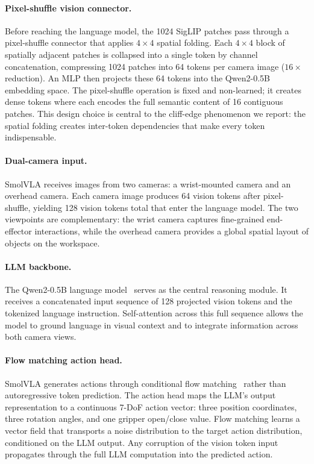 \paragraph{Pixel-shuffle vision connector.}
Before reaching the language model, the 1024 SigLIP patches pass through a pixel-shuffle connector that applies $4 \times 4$ spatial folding. Each $4 \times 4$ block of spatially adjacent patches is collapsed into a single token by channel concatenation, compressing 1024 patches into 64 tokens per camera image ($16\times$ reduction). An MLP then projects these 64 tokens into the Qwen2-0.5B embedding space. The pixel-shuffle operation is fixed and non-learned; it creates dense tokens where each encodes the full semantic content of 16 contiguous patches. This design choice is central to the cliff-edge phenomenon we report: the spatial folding creates inter-token dependencies that make every token indispensable.

\paragraph{Dual-camera input.}
SmolVLA receives images from two cameras: a wrist-mounted camera and an overhead camera.
Each camera image produces 64 vision tokens after pixel-shuffle, yielding 128 vision tokens total that enter the language model.
The two viewpoints are complementary: the wrist camera captures fine-grained end-effector interactions, while the overhead camera provides a global spatial layout of objects on the workspace.

\paragraph{LLM backbone.}
The Qwen2-0.5B language model~\cite{yang2024qwen2} serves as the central reasoning module.
It receives a concatenated input sequence of 128 projected vision tokens and the tokenized language instruction.
Self-attention across this full sequence allows the model to ground language in visual context and to integrate information across both camera views.

\paragraph{Flow matching action head.}
SmolVLA generates actions through conditional flow matching~\cite{lipman2023flow} rather than autoregressive token prediction.
The action head maps the LLM's output representation to a continuous 7-DoF action vector: three position coordinates, three rotation angles, and one gripper open/close value.
Flow matching learns a vector field that transports a noise distribution to the target action distribution, conditioned on the LLM output.
Any corruption of the vision token input propagates through the full LLM computation into the predicted action.

